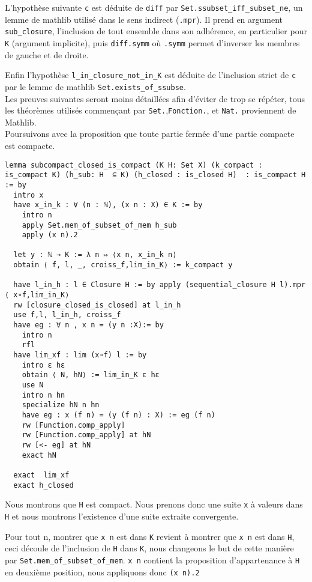 \documentclass[a4paper, 12pt]{article}
\newcommand{\lean}[1]{\texttt{#1}}
\begin{document}
L'hypothèse suivante \lean{c} est déduite de \lean{diff} par \lean{Set.ssubset_iff_subset_ne}, un lemme de mathlib utilisé dans le sens indirect (\lean{.mpr}). Il prend en argument \lean{sub_closure}, l'inclusion de tout ensemble dans son adhérence, en particulier pour \lean{K} (argument implicite), puis \lean{diff.symm} où \lean{.symm} permet d'inverser les membres de gauche et de droite.

Enfin l'hypothèse \lean{l_in_closure_not_in_K} est déduite de l'inclusion strict de \lean{c} par le lemme de mathlib \lean{Set.exists_of_ssubse}.\\


Les preuves suivantes seront moins détaillées afin d'éviter de trop se répéter, tous les théorèmes utilisés commençant par \lean{Set.},\lean{Fonction.}, et \lean{Nat.}  proviennent de Mathlib.\\


Poursuivons avec la proposition que toute partie fermée d'une partie compacte est compacte.


\begin{verbatim}   
lemma subcompact_closed_is_compact (K H: Set X) (k_compact : is_compact K) (h_sub: H  ⊆ K) (h_closed : is_closed H)  : is_compact H := by
  intro x
  have x_in_k : ∀ (n : ℕ), (x n : X) ∈ K := by
    intro n
    apply Set.mem_of_subset_of_mem h_sub
    apply (x n).2

  let y : ℕ → K := λ n ↦ ⟨x n, x_in_k n⟩
  obtain ⟨ f, l, _, croiss_f,lim_in_K⟩ := k_compact y

  have l_in_h : l ∈ Closure H := by apply (sequential_closure H l).mpr  ⟨ x∘f,lim_in_K⟩
  rw [closure_closed_is_closed] at l_in_h
  use f,l, l_in_h, croiss_f
  have eg : ∀ n , x n = (y n :X):= by
    intro n
    rfl
  have lim_xf : lim (x∘f) l := by
    intro ε hε
    obtain ⟨ N, hN⟩ := lim_in_K ε hε
    use N
    intro n hn
    specialize hN n hn
    have eg : x (f n) = (y (f n) : X) := eg (f n)
    rw [Function.comp_apply]
    rw [Function.comp_apply] at hN
    rw [<- eg] at hN
    exact hN
    
  exact  lim_xf
  exact h_closed
\end{verbatim}

Nous montrons que \lean{H} est compact. Nous prenons donc une suite \lean{x} à valeurs dans \lean{H} et nous montrons l'existence d'une suite extraite convergente.

Pour tout n, montrer que \lean{x n} est dans \lean{K} revient à montrer que \lean{x n} est dans \lean{H}, ceci découle de l'inclusion de \lean{H} dans \lean{K}, nous changeons le but de cette manière par \lean{Set.mem_of_subset_of_mem}. \lean{x n} contient la proposition d'appartenance à \lean{H} en deuxième position, nous appliquons donc \lean{(x n).2}
\end{document}
